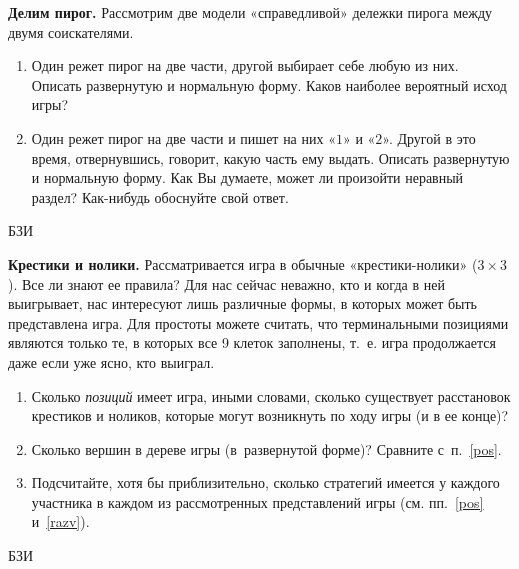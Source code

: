 \begin{problem}
 {\bf Делим пирог.} Рассмотрим две модели
«справедливой» дележки пирога между двумя соискателями.

\begin{enumerate}

\item Один режет пирог на две части, другой выбирает себе
любую из них. Описать развернутую и нормальную форму. Каков
наиболее вероятный исход игры?

\item Один режет пирог на две части и пишет на них «$1$»
и «$2$». Другой в это время, отвернувшись, говорит, какую
часть ему выдать. Описать развернутую и нормальную форму.
Как Вы думаете, может ли произойти неравный раздел?
Как-нибудь обоснуйте свой ответ.

\end{enumerate}



\begin{source}
БЗИ
\end{source}


\begin{sol}

\end{sol}
\end{problem}




\begin{problem}
 {\bf Крестики и нолики.} Рассматривается игра в
обычные «крестики-нолики» (${3\times 3}$). Все ли знают
ее правила? Для нас сейчас неважно, кто и когда в ней
выигрывает, нас интересуют лишь различные формы, в которых
может быть представлена игра. Для простоты можете считать,
что терминальными позициями являются только те, в которых
все 9 клеток заполнены, т.~е. игра продолжается даже если
уже ясно, кто выиграл.

\begin{enumerate}

\item\label{pos} Сколько {\it позиций} имеет игра, иными
словами, сколько существует расстановок крестиков и
ноликов, которые могут возникнуть по ходу игры (и в ее
конце)?

\item\label{razv} Сколько вершин в дереве игры
(в~развернутой форме)?  Сравните с~п.~\ref{pos}.

\item Подсчитайте, хотя бы приблизительно, сколько
стратегий имеется у каждого участника в каждом из
рассмотренных представлений игры (см. пп.~\ref{pos}
и~\ref{razv}).

\end{enumerate}



\begin{source}
БЗИ
\end{source}


\begin{sol}

\end{sol}
\end{problem}




